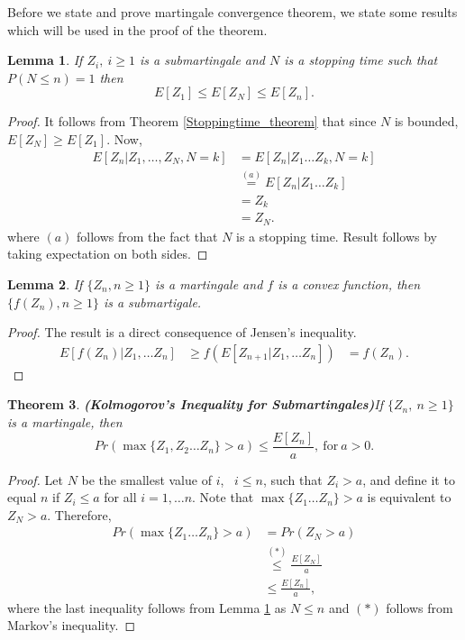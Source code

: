 \documentclass[a4paper,10pt]{article}
\theoremstyle{plain}
\newtheorem{thm}{Theorem}[section]
\newtheorem{lem}[thm]{Lemma}
\theoremstyle{definition}
\theoremstyle{remark}
\begin{document}
Before we state and prove martingale convergence theorem, we state some results which will be used in the proof of the theorem.
\begin{lem}
\label{StoppingTimeBound}
If ${Z_i,~i\geq 1}$ is  a submartingale and $N$ is a stopping time such that $P(N \leq n)=1$ then
\begin{equation*}
 E[Z_1] \leq E[Z_N] \leq E[Z_n].
\end{equation*}
\end{lem}
\begin{proof}
It follows from Theorem \ref{Stoppingtime_theorem} that since $N$ is bounded, $E[Z_N] \geq E[Z_1]$. Now, 
\begin{eqnarray*}
E[Z_n|Z_1, \hdots ,Z_N,N=k]&=E[Z_n|Z_1 \hdots Z_k,N=k]\\
&\stackrel{(a)}{=}E[Z_n|Z_1 \hdots Z_k]\\
&=Z_k\\
&=Z_N.
\end{eqnarray*}
where $(a)$ follows from the fact that $N$ is  a stopping time. Result follows by taking expectation on both sides.
\end{proof}
\begin{lem}
\label{ConvexFuncSubmart}
If $\{Z_n,n \geq 1\}$ is a martingale and $f$ is a convex function, then $\{f(Z_n),n \geq 1\}$ is a submartigale.
\end{lem}
\begin{proof}
The result is a direct consequence of Jensen's inequality.
\begin{eqnarray*}
E[f(Z_n)|Z_1, \hdots Z_n] &\geq f(E[Z_{n+1}|Z_1, \hdots Z_n])
&=f(Z_n).
\end{eqnarray*}
\end{proof}
\begin{thm}
\textbf{(Kolmogorov's Inequality for Submartingales)}If $\{Z_n,~ n \geq 1\}$ is a martingale, then
\begin{equation*}
Pr(\max\{Z_1,Z_2 \hdots Z_n\}>a)\leq \frac{E[Z_n]}{a},~ \text{for}~ a>0.
\end{equation*}
\end{thm}
\begin{proof}
Let $N$ be the smallest value of $i$,~ $i \leq n$, such that $Z_i >a$, and define it to equal $n$ if $Z_i \leq a$ for all $i=1, \hdots n$. Note that $\max\{Z_1 \hdots Z_n\}>a$ is equivalent to $Z_N>a$. Therefore,
\begin{eqnarray*}
Pr(\max\{Z_1 \hdots Z_n\}>a)&=Pr(Z_N>a)\\
&\stackrel{(*)}{\leq} \frac{E[Z_N]}{a}\\
&\leq  \frac{E[Z_n]}{a},
\end{eqnarray*}
where the last inequality follows from Lemma \ref{StoppingTimeBound} as $N \leq n$ and $(*)$ follows from Markov's inequality.
\end{proof}
\end{document}
